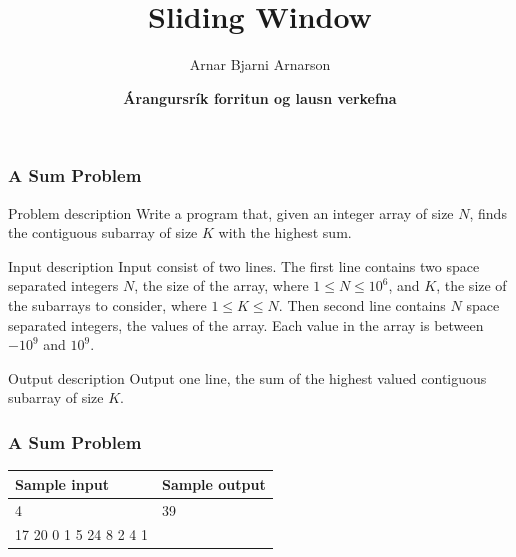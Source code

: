 \documentclass[10pt]{beamer}
\title{Sliding Window}
\author{Arnar Bjarni Arnarson}
\institute{\href{http://ru.is/td}{School of Computer Science} \\[2pt] \href{http://ru.is}{Reykjavík University}}
\date{\textbf{Árangursrík forritun og lausn verkefna}}
\begin{document}
\begin{frame}[plain]
    \titlepage
\end{frame}

\begin{frame}[plain]
	\frametitle{A Sum Problem}
	\begin{block}{Problem description}
    	    Write a program that, given an integer array of size $N$, finds the
            contiguous subarray of size $K$ with the highest sum.
    \end{block}

    \vspace{10pt}
    
    \begin{block}{Input description}
            Input consist of two lines.
            The first line contains two space separated integers $N$, the size of the array, where $1 \leq N \leq 10^6$,
    and $K$, the size of the subarrays to consider, where $1 \leq K \leq N$.
            Then second line contains $N$ space separated integers, the values of the array.
            Each value in the array is between $-10^9$  and $10^9$.
    \end{block}

    \vspace{10pt}
    
    \begin{block}{Output description}
            Output one line, the sum of the highest valued contiguous subarray of size $K$.
    \end{block}
\end{frame}

\begin{frame}[plain]
	\frametitle{A Sum Problem}
	\begin{center}
		\begin{tabular}{|l|l|}
            \hline
            {\footnotesize Sample input} & {\footnotesize Sample output} \\
            \hline
            \ttfamily
            10 4 & 39 \\
            17 20 0 1 5 24 8 2 4 1 &  \\
            \hline
        \end{tabular}
    \end{center}
\end{frame}
\end{document}
